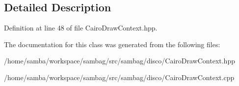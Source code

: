 \subsection{Detailed Description}


Definition at line 48 of file CairoDrawContext.hpp.



The documentation for this class was generated from the following files:\begin{DoxyCompactItemize}
\item 
/home/samba/workspace/sambag/src/sambag/disco/CairoDrawContext.hpp\item 
/home/samba/workspace/sambag/src/sambag/disco/CairoDrawContext.cpp\end{DoxyCompactItemize}
